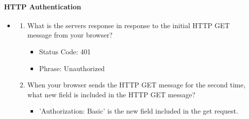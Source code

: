 \documentclass{article}
\begin{document}
  \paragraph{HTTP Authentication}
  \begin{itemize}
    \item\begin{enumerate}
      \item What is the servers response in response to the initial HTTP GET message from your browser?
        \begin{itemize}
          \item Status Code: 401
          \item Phrase: Unauthorized
        \end{itemize}
      \item When your browser sends the HTTP GET message for the second time, what new field is included in the HTTP GET message?
          \begin{itemize}
            \item 'Authorization: Basic' is the new field included in the get request.
          \end{itemize}
    \end{enumerate}
  \end{itemize}
\end{document}
